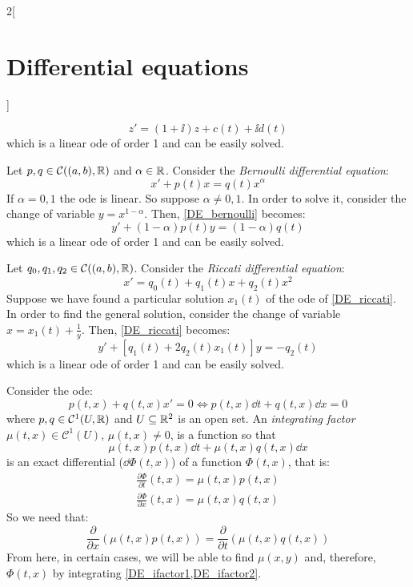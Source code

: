\documentclass[../../../main.tex]{subfiles}
\begin{document}
\begin{multicols}{2}[\section{Differential equations}]
\begin{method}
    $$z'=(1+\ii)z+c(t)+\ii d(t)$$ which is a linear ode of order 1 and can be easily solved.
  \end{method}
  \begin{method}
    Let $p,q\in\mathcal{C}((a,b),\mathbb{R})$ and $\alpha\in\mathbb{R}$. Consider the \textit{Bernoulli differential equation}:
    \begin{equation}\label{DE_bernoulli}
      x'+p(t)x=q(t)x^\alpha
    \end{equation}
    If $\alpha=0,1$ the ode is linear. So suppose $\alpha\ne 0,1$. In order to solve it, consider the change of variable $y=x^{1-\alpha}$. Then, \cref{DE_bernoulli} becomes:
    $$y'+(1-\alpha)p(t)y=(1-\alpha)q(t)$$  which is a linear ode of order 1 and can be easily solved.
  \end{method}
  \begin{method}
    Let $q_0,q_1,q_2\in\mathcal{C}((a,b),\mathbb{R})$. Consider the \textit{Riccati differential equation}:
    \begin{equation}\label{DE_riccati}
      x'=q_0(t)+q_1(t)x+q_2(t)x^2
    \end{equation}
    Suppose we have found a particular solution $x_1(t)$ of the ode of \cref{DE_riccati}. In order to find the general solution, consider the change of variable $x=x_1(t)+\frac{1}{y}$. Then, \cref{DE_riccati} becomes:
    $$y'+[q_1(t)+2q_2(t)x_1(t)]y=-q_2(t)$$ which is a linear ode of order 1 and can be easily solved.
  \end{method}
  \begin{method}
    Consider the ode: $$p(t,x)+q(t,x)x'=0\iff p(t,x)\dd t+q(t,x)\dd x=0$$ where $p,q\in\mathcal{C}^1(U,\mathbb{R})$ and $U\subseteq\mathbb{R}^2$ is an open set.
    An \textit{integrating factor} $\mu(t,x)\in\mathcal{C}^1(U)$, $\mu(t,x)\ne 0$, is a function so that $$\mu(t,x)p(t,x)\dd t+\mu(t,x)q(t,x)\dd x$$ is an exact differential ($\dd \Phi(t,x)$) of a function $\Phi(t,x)$, that is:
    \begin{gather}
      \label{DE_ifactor1}\frac{\partial\Phi}{\partial t}(t,x)=\mu(t,x)p(t,x)\\
      \label{DE_ifactor2}\frac{\partial\Phi}{\partial x}(t,x)=\mu(t,x)q(t,x)
    \end{gather}
    So we need that: $$\frac{\partial}{\partial x}\left(\mu(t,x)p(t,x)\right)=\frac{\partial}{\partial t}\left(\mu(t,x)q(t,x)\right)$$
    From here, in certain cases, we will be able to find $\mu(x,y)$ and, therefore, $\Phi(t,x)$ by integrating \cref{DE_ifactor1,DE_ifactor2}.
  \end{method}

\end{multicols}
\end{document}
